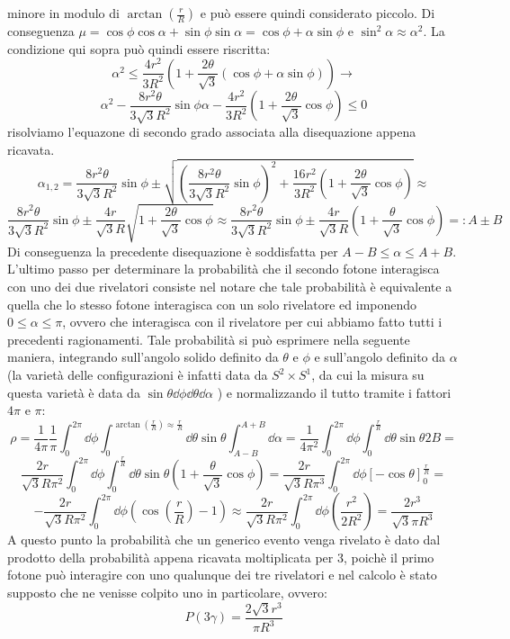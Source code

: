   minore in modulo di \(\arctan\left( \frac{r}{R} \right)\) e può essere quindi considerato piccolo. Di conseguenza \(\mu = \cos \phi \cos \alpha + \sin \phi \sin \alpha = \cos \phi + \alpha \sin \phi \)
  e \(\sin^2 \alpha \approx \alpha^2\). La condizione qui sopra può quindi essere riscritta:
  $$ \alpha^2 \le  \frac{4r^2}{3R^2} \left(1 + \frac{2\theta}{\sqrt{3}} \left( \cos \phi + \alpha \sin \phi \right)  \right)  \to $$
  $$ \alpha^2 -\frac{8r^2\theta}{3\sqrt{3}R^2}\sin \phi \alpha -\frac{4r^2}{3R^2}\left( 1 +\frac{2 \theta}{\sqrt{3}} \cos \phi \right) \le 0 $$
  risolviamo l'equazone di secondo grado associata alla disequazione appena ricavata.
  $$ \alpha_{1,2} = \frac{8r^2\theta}{3\sqrt{3}R^2}\sin \phi \pm \sqrt{ \left( \frac{8r^2\theta}{3\sqrt{3}R^2}\sin \phi \right)^2 + \frac{16r^2}{3R^2}\left( 1 +\frac{2 \theta}{\sqrt{3}} \cos \phi \right)} \approx $$
  $$ \frac{8r^2\theta}{3\sqrt{3}R^2}\sin \phi \pm \frac{4r}{\sqrt{3}R}\sqrt{ 1 +\frac{2 \theta}{\sqrt{3}} \cos \phi} \approx \frac{8r^2\theta}{3\sqrt{3}R^2}\sin \phi \pm \frac{4r}{\sqrt{3}R}\left( 1 +\frac{\theta}{\sqrt{3}} \cos \phi \right) =: A \pm B$$
  Di conseguenza la precedente disequazione è soddisfatta per \(A-B\le \alpha \le A + B\).\\
  L'ultimo passo per determinare la probabilità che il secondo fotone interagisca con uno dei due rivelatori consiste nel notare che tale probabilità è equivalente a quella
  che lo stesso fotone interagisca con un solo rivelatore ed imponendo \(0 \le \alpha \le \pi\), ovvero che interagisca con il rivelatore per cui abbiamo fatto tutti i precedenti
  ragionamenti. Tale probabilità si può esprimere nella seguente maniera, integrando sull'angolo solido definito da \(\theta\) e \(\phi\) e sull'angolo definito da \(\alpha\)
  (la varietà delle configurazioni è infatti data da \(S^2 \times S^1\), da cui la misura su questa varietà è data da \(\sin \theta \dd\phi \dd\theta \dd\alpha\) ) e normalizzando il tutto
  tramite i fattori \(4 \pi\) e \(\pi\):
  $$ \rho = \frac{1}{4\pi}\frac{1}{\pi}\int_{0}^{2\pi} \dd\phi \int_{0}^{\arctan\left(\frac{r}{R}\right)\approx \frac{r}{R}} \dd\theta \sin \theta \int_{A-B}^{A+B} \dd\alpha = 
  \frac{1}{4 \pi^2}\int_{0}^{2\pi} \dd\phi \int_{0}^{\frac{r}{R}} \dd\theta \sin \theta 2B =$$
  $$ \frac{2r}{\sqrt{3}R \pi^2}\int_{0}^{2\pi} \dd\phi \int_{0}^{\frac{r}{R}} \dd\theta \sin \theta \left( 1 +\frac{\theta}{\sqrt{3}} \cos \phi \right) =
  \frac{2r}{\sqrt{3} R \pi^3}\int_{0}^{2\pi} \dd\phi \left[ - \cos \theta \right]_{0}^{\frac{r}{R}} = $$ 
  $$- \frac{2r}{\sqrt{3} R \pi^2}\int_{0}^{2\pi} \dd\phi \left( \cos \left( \frac{r}{R} \right) -1 \right) \approx
  \frac{2r}{\sqrt{3} R \pi^2}\int_{0}^{2\pi} \dd\phi \left(\frac{r^2}{2R^2} \right) = \frac{2 r^3}{\sqrt{3} \pi R^3} $$
  A questo punto la probabilità che un generico evento venga rivelato è dato dal prodotto della probabilità appena ricavata moltiplicata per 3, poichè il primo fotone può
  interagire con uno qualunque dei tre rivelatori e nel calcolo è stato supposto che ne venisse colpito uno in particolare, ovvero:
  $$ P \left( 3 \gamma \right) = \frac{2 \sqrt{3} r^3}{ \pi R^3} $$
